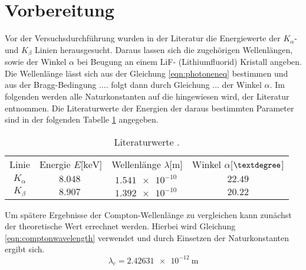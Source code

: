 \section{Vorbereitung}

Vor der Versuchsdurchführung wurden in der Literatur die Energiewerte der $K_{\alpha}$- und $K_{\beta}$ Linien herausgesucht. Daraus lassen sich die zugehörigen Wellenlängen, sowie der Winkel
$\alpha$ bei Beugung an einem LiF- (Lithiumfluorid) Kristall angeben. Die Wellenlänge lässt sich aus der Gleichung \eqref{eqn:photoneneq} bestimmen und aus der Bragg-Bedingung .... folgt dann durch Gleichung ... der Winkel $\alpha$.
Im folgenden werden alle Naturkonstanten auf die hingewiesen wird, der Literatur \cite{Naturkonstanten} entnommen.
Die Literaturwerte der Energien der daraus bestimmten Parameter \cite{database} sind in der folgenden Tabelle \ref{tab:vorbereitung} angegeben.
\begin{table}
\centering
\caption{Literaturwerte \cite{database}.}
\label{tab:vorbereitung}
\begin{tabular}{c c c c}
    \toprule
    Linie & Energie $E$[$\si{\kilo\electronvolt}$] & Wellenlänge $\lambda$[$\si{\meter}$] & Winkel $\alpha$[$\textdegree$]\\
    $K_{\alpha}$    &  $\SI{8.048}{}$ & $\SI{1.541e-10}{}$  & $22.49$ \\
    $K_{\beta}$   &   $\SI{8.907}{}$  & $\SI{1.392e-10}{}$  & $20.22$ \\
    \midrule
\end{tabular}
\end{table}
Um spätere Ergebnisse der Compton-Wellenlänge zu vergleichen kann zunächst der theoretische Wert errechnet werden. Hierbei wird Gleichung
\eqref{eqn:comptonwavelength} verwendet und durch Einsetzen der Naturkonstanten ergibt sich.
\begin{equation}
\label{eqn:comptontheoriewert}
\lambda_{c} = \SI{2.42631e-12}{\meter}
\end{equation}